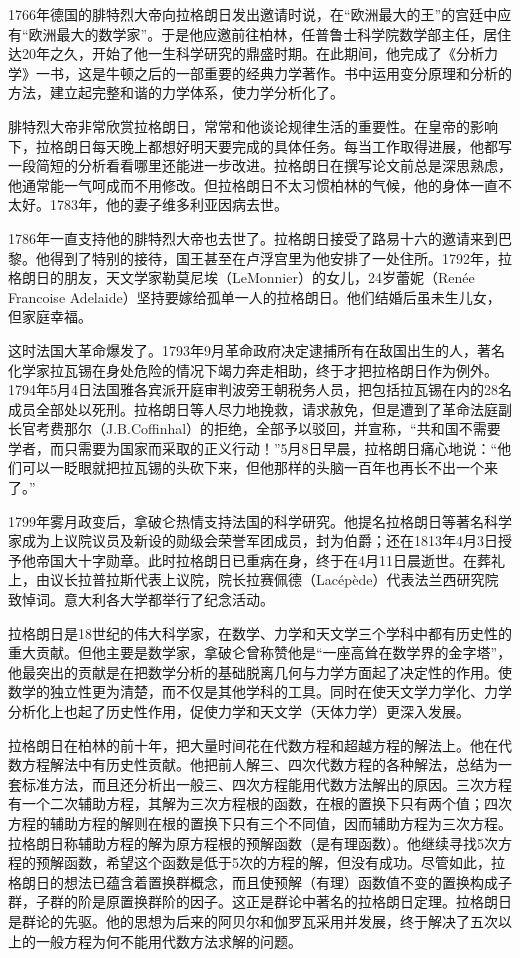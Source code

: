 \documentclass{article}
\begin{document}
1766年德国的腓特烈大帝向拉格朗日发出邀请时说，在“欧洲最大的王”的宫廷中应有“欧洲最大的数学家”。于是他应邀前往柏林，任普鲁士科学院数学部主任，居住达20年之久，开始了他一生科学研究的鼎盛时期。在此期间，他完成了《分析力学》一书，这是牛顿之后的一部重要的经典力学著作。书中运用变分原理和分析的方法，建立起完整和谐的力学体系，使力学分析化了。

腓特烈大帝非常欣赏拉格朗日，常常和他谈论规律生活的重要性。在皇帝的影响下，拉格朗日每天晚上都想好明天要完成的具体任务。每当工作取得进展，他都写一段简短的分析看看哪里还能进一步改进。拉格朗日在撰写论文前总是深思熟虑，他通常能一气呵成而不用修改。但拉格朗日不太习惯柏林的气候，他的身体一直不太好。1783年，他的妻子维多利亚因病去世。

1786年一直支持他的腓特烈大帝也去世了。拉格朗日接受了路易十六的邀请来到巴黎。他得到了特别的接待，国王甚至在卢浮宫里为他安排了一处住所。1792年，拉格朗日的朋友，天文学家勒莫尼埃（LeMonnier）的女儿，24岁蕾妮（Renée Francoise Adelaide）坚持要嫁给孤单一人的拉格朗日。他们结婚后虽未生儿女，但家庭幸福。

这时法国大革命爆发了。1793年9月革命政府决定逮捕所有在敌国出生的人，著名化学家拉瓦锡在身处危险的情况下竭力奔走相助，终于才把拉格朗日作为例外。1794年5月4日法国雅各宾派开庭审判波旁王朝税务人员，把包括拉瓦锡在内的28名成员全部处以死刑。拉格朗日等人尽力地挽救，请求赦免，但是遭到了革命法庭副长官考费那尔（J.B.Coffinhal）的拒绝，全部予以驳回，并宣称，“共和国不需要学者，而只需要为国家而采取的正义行动！”5月8日早晨，拉格朗日痛心地说：“他们可以一眨眼就把拉瓦锡的头砍下来，但他那样的头脑一百年也再长不出一个来了。”\cite{Wiki-Lagrange}

1799年雾月政变后，拿破仑热情支持法国的科学研究。他提名拉格朗日等著名科学家成为上议院议员及新设的勋级会荣誉军团成员，封为伯爵；还在1813年4月3日授予他帝国大十字勋章。此时拉格朗日已重病在身，终于在4月11日晨逝世。在葬礼上，由议长拉普拉斯代表上议院，院长拉赛佩德（Lacépède）代表法兰西研究院致悼词。意大利各大学都举行了纪念活动。

拉格朗日是18世纪的伟大科学家，在数学、力学和天文学三个学科中都有历史性的重大贡献。但他主要是数学家，拿破仑曾称赞他是“一座高耸在数学界的金字塔”，他最突出的贡献是在把数学分析的基础脱离几何与力学方面起了决定性的作用。使数学的独立性更为清楚，而不仅是其他学科的工具。同时在使天文学力学化、力学分析化上也起了历史性作用，促使力学和天文学（天体力学）更深入发展。

拉格朗日在柏林的前十年，把大量时间花在代数方程和超越方程的解法上。他在代数方程解法中有历史性贡献。他把前人解三、四次代数方程的各种解法，总结为一套标准方法，而且还分析出一般三、四次方程能用代数方法解出的原因。三次方程有一个二次辅助方程，其解为三次方程根的函数，在根的置换下只有两个值；四次方程的辅助方程的解则在根的置换下只有三个不同值，因而辅助方程为三次方程。拉格朗日称辅助方程的解为原方程根的预解函数（是有理函数）。他继续寻找5次方程的预解函数，希望这个函数是低于5次的方程的解，但没有成功。尽管如此，拉格朗日的想法已蕴含着置换群概念，而且使预解（有理）函数值不变的置换构成子群，子群的阶是原置换群阶的因子。这正是群论中著名的拉格朗日定理。拉格朗日是群论的先驱。他的思想为后来的阿贝尔和伽罗瓦采用并发展，终于解决了五次以上的一般方程为何不能用代数方法求解的问题。
\end{document}
